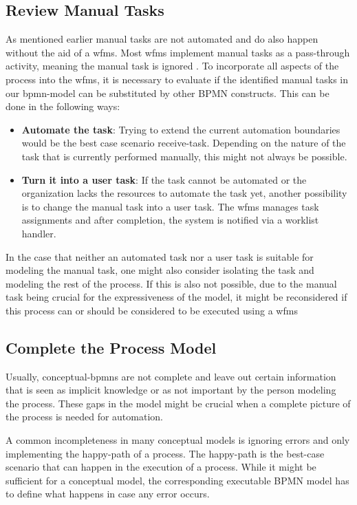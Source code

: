 \subsection{Review Manual Tasks}\label{manual}
As mentioned earlier manual tasks are not automated and do also happen without the aid of a \gls{wfms}. Most \gls{wfms} implement manual tasks as a pass-through activity, meaning the manual task is ignored \cite{manual-activity}\cite{manual-camunda}\cite{manual-bizagi}. To incorporate all aspects of the process into the \gls{wfms}, it is necessary to evaluate if the identified manual tasks in our \gls{bpmn}-model can be substituted by other BPMN constructs. This can be done in the following ways:
\begin{itemize}
	\item \textbf{Automate the task}: Trying to extend the current automation boundaries would be the best case scenario \gls{receive-task}. Depending on the nature of the task that is currently performed manually, this might not always be possible. 
	
	\item \textbf{Turn it into a user task}: If the task cannot be automated or the organization lacks the resources to automate the task yet, another possibility is to change the manual task into a user task. The \gls{wfms} manages task assignments and after completion, the system is notified via a worklist handler. \cite{stefanov2014business}
\end{itemize}

In the case that neither an automated task nor a user task is suitable for modeling the manual task, one might also consider isolating the task and modeling the rest of the process. If this is also not possible, due to the manual task being crucial for the expressiveness of the model, it might be reconsidered if this process can or should be considered to be executed using a \gls{wfms}\cite[p.~228]{freund2019real}

\subsection{Complete the Process Model}\label{complete}
Usually, \gls{conceptual-bpmn}s are not complete and leave out certain information that is seen as implicit knowledge or as not important by the person modeling the process. These gaps in the model might be crucial when a complete picture of the process is needed for automation. 

A common incompleteness in many conceptual models is ignoring errors and only implementing the \gls{happy-path} of a process. The \gls{happy-path} is the best-case scenario that can happen in the execution of a process. While it might be sufficient for a conceptual model, the corresponding executable BPMN model has to define what happens in case any error occurs. 

